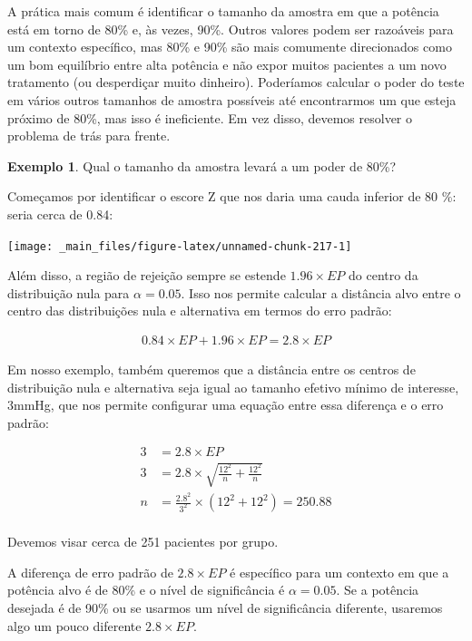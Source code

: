 \documentclass[
]{book}
\theoremstyle{definition}
\theoremstyle{definition}
\newtheorem{example}{Exemplo}[chapter]
\theoremstyle{definition}
\theoremstyle{definition}
\theoremstyle{remark}
\begin{document}
A prática mais comum é identificar o tamanho da amostra em que a potência está em torno de 80\% e, às vezes, 90\%. Outros valores podem ser razoáveis para um contexto específico, mas 80\% e 90\% são mais comumente direcionados como um bom equilíbrio entre alta potência e não expor muitos pacientes a um novo tratamento (ou desperdiçar muito dinheiro). Poderíamos calcular o poder do teste em vários outros tamanhos de amostra possíveis até encontrarmos um que esteja próximo de 80\%, mas isso é ineficiente. Em vez disso, devemos resolver o problema de trás para frente.

\begin{example}
\protect\hypertarget{exm:unnamed-chunk-216}{}{\label{exm:unnamed-chunk-216} }Qual o tamanho da amostra levará a um poder de 80\%?
\end{example}

Começamos por identificar o escore Z que nos daria uma cauda inferior de 80 \%: seria cerca de 0.84:

\texttt{[image: \_main\_files/figure-latex/unnamed-chunk-217-1]}

Além disso, a região de rejeição sempre se estende \(1.96\times EP\) do centro da distribuição nula para \(\alpha = 0.05\). Isso nos permite calcular a distância alvo entre o centro das distribuições nula e alternativa em termos do erro padrão:

\begin{align*}
0.84 \times EP + 1.96 \times EP = 2.8 \times EP
\end{align*}

Em nosso exemplo, também queremos que a distância entre os centros de distribuição nula e alternativa seja igual ao tamanho efetivo mínimo de interesse, 3mmHg, que nos permite configurar uma equação entre essa diferença e o erro padrão:

\begin{align*}
3 &= 2.8 \times EP \\
3 &= 2.8 \times \sqrt{\frac{12^2}{n} + \frac{12^2}{n}} \\
n &= \frac{2.8^2}{3^2} \times \left( 12^2 + 12^2 \right) = 250.88 \\
\end{align*}

Devemos visar cerca de 251 pacientes por grupo.

A diferença de erro padrão de \(2.8 \times EP\) é específico para um contexto em que a potência alvo é de 80\% e o nível de significância é \(\alpha = 0.05\). Se a potência desejada é de 90\% ou se usarmos um nível de significância diferente, usaremos algo um pouco diferente \(2.8 \times EP\).
\end{document}
